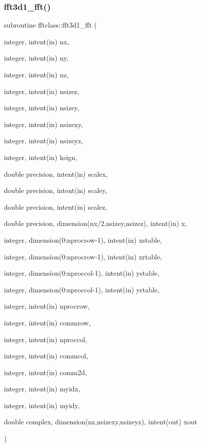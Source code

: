 \subsubsection{\texorpdfstring{fft3d1\_fft()}{fft3d1\_fft()}}
{\footnotesize\ttfamily subroutine fftclass\+::fft3d1\+\_\+fft (\begin{DoxyParamCaption}\item[{integer, intent(in)}]{nx,  }\item[{integer, intent(in)}]{ny,  }\item[{integer, intent(in)}]{nz,  }\item[{integer, intent(in)}]{nsizez,  }\item[{integer, intent(in)}]{nsizey,  }\item[{integer, intent(in)}]{nsizexy,  }\item[{integer, intent(in)}]{nsizeyz,  }\item[{integer, intent(in)}]{ksign,  }\item[{double precision, intent(in)}]{scalex,  }\item[{double precision, intent(in)}]{scaley,  }\item[{double precision, intent(in)}]{scalez,  }\item[{double precision, dimension(nx/2,nsizey,nsizez), intent(in)}]{x,  }\item[{integer, dimension(0\+:nprocrow-\/1), intent(in)}]{xstable,  }\item[{integer, dimension(0\+:nprocrow-\/1), intent(in)}]{xrtable,  }\item[{integer, dimension(0\+:nproccol-\/1), intent(in)}]{ystable,  }\item[{integer, dimension(0\+:nproccol-\/1), intent(in)}]{yrtable,  }\item[{integer, intent(in)}]{nprocrow,  }\item[{integer, intent(in)}]{commrow,  }\item[{integer, intent(in)}]{nproccol,  }\item[{integer, intent(in)}]{commcol,  }\item[{integer, intent(in)}]{comm2d,  }\item[{integer, intent(in)}]{myidx,  }\item[{integer, intent(in)}]{myidy,  }\item[{double complex, dimension(nz,nsizexy,nsizeyz), intent(out)}]{xout }\end{DoxyParamCaption})}



